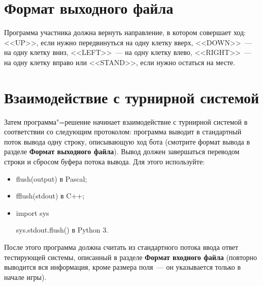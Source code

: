 \documentclass[a4paper,12pt]{article}
\begin{document}
\section{Формат выходного файла}
Программа участника должна вернуть направление, в котором совершает ход: <<UP>>, если нужно передвинуться на одну клетку вверх, <<DOWN>>~--- на одну клетку вниз, <<LEFT>>~--- на одну клетку влево, <<RIGHT>>~--- на одну клетку вправо или <<STAND>>, если нужно остаться на месте.

\section{Взаимодействие с турнирной системой}
Затем программа"=решение начинает взаимодействие с турнирной системой в соответствии со следующим протоколом:
программа выводит в стандартный поток вывода одну строку, описывающую ход бота (смотрите формат вывода в разделе \textbf{Формат выходного файла}). Вывод должен завершаться переводом строки и сбросом буфера потока
вывода. Для этого используйте:
\begin{itemize}
\item flush(output) в Pascal;
\item fflush(stdout) в C++;
\item import sys
      
      sys.stdout.flush() в Python 3.
\end{itemize}
После этого программа должна считать из стандартного потока ввода ответ тестирующей системы, описанный в разделе \textbf{Формат входного файла} (повторно выводится вся информация, кроме размера поля~--- он указывается только в начале игры).
\end{document}
